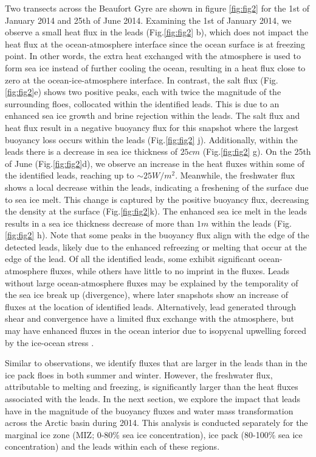 \documentclass[draft]{agujournal2019}
\begin{document}
Two transects across the Beaufort Gyre are shown in figure \ref{fig:fig2} for the 1st of January 2014 and 25th of June 2014.
Examining the 1st of January 2014, we observe a small heat flux in the leads (Fig.\ref{fig:fig2} b), which does not impact the heat flux at the ocean-atmosphere interface since the ocean surface is at freezing point. 
In other words, the extra heat exchanged with the atmosphere is used to form sea ice instead of further cooling the ocean, resulting in a heat flux close to zero at the ocean-ice-atmosphere interface.
In contrast, the salt flux (Fig.\ref{fig:fig2}e) shows two positive peaks, each with twice the magnitude of the surrounding floes, collocated within the identified leads. This is due to an enhanced sea ice growth and brine rejection within the leads. 
The salt flux and heat flux result in a negative buoyancy flux for this snapshot where the largest buoyancy loss occurs within the leads (Fig.\ref{fig:fig2} j). Additionally, within the leads there is a decrease in sea ice thickness of $25cm$ (Fig.\ref{fig:fig2} g). 
On the 25th of June (Fig.\ref{fig:fig2}d), we observe an increase in the heat fluxes within some of the identified leads, reaching up to $\sim 25 W/m^2$. Meanwhile, the freshwater flux shows a local decrease within the leads, indicating a freshening of the surface due to sea ice melt. This change is captured by the positive buoyancy flux, decreasing the density at the surface (Fig.\ref{fig:fig2}k).  The enhanced sea ice melt in the leads results in a sea ice thickness decrease of more than $1m$ within the leads  (Fig.\ref{fig:fig2} h). Note that some peaks in the buoyancy flux align with the edge of the detected leads, likely due to the enhanced refreezing or melting that occur at the edge of the lead. 
Of all the identified leads, some exhibit significant ocean-atmosphere fluxes, while others have little to no imprint in the fluxes. Leads without large ocean-atmosphere fluxes may be explained by the temporality of the sea ice break up (divergence), where later snapshots show an increase of fluxes at the location of identified leads. Alternatively, lead generated through shear and convergence have a limited flux exchange with the atmosphere, but may have enhanced fluxes in the ocean interior due to isopycnal upwelling forced by the ice-ocean stress \citep{Bourgault_flux_lkf_2020}.

Similar to observations, we identify fluxes that are larger in the leads than in the ice pack floes in both summer and winter. However, the freshwater flux, attributable to melting and freezing, is significantly larger than the heat fluxes associated with the leads. In the next section, we explore the impact that leads have in the magnitude of the buoyancy fluxes and water mass transformation across the Arctic basin during 2014. This analysis is conducted separately for the marginal ice zone (MIZ; 0-80\% sea ice concentration), ice pack (80-100\% sea ice concentration) and the leads within each of these regions. 
\end{document}
